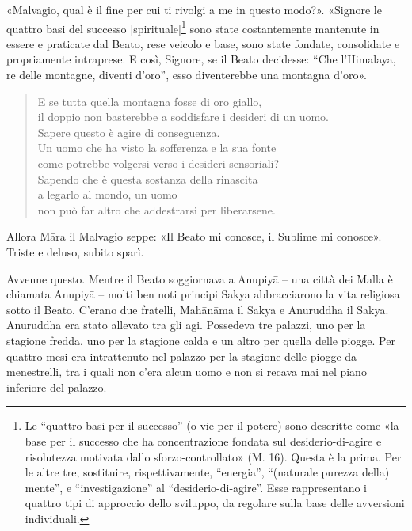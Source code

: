«Malvagio, qual è il fine per cui ti rivolgi a me in questo modo?». «Signore le
quattro basi del successo [spirituale]\footnote{Le “quattro basi per il
  successo” (o vie per il potere) sono descritte come «la base per il successo
  che ha concentrazione fondata sul desiderio-di-agire e risolutezza motivata
  dallo sforzo-controllato» (M. 16). Questa è la prima. Per le altre tre,
  sostituire, rispettivamente, “energia”, “(naturale purezza della) mente”, e
  “investigazione” al “desiderio-di-agire”. Esse rappresentano i quattro tipi di
  approccio dello sviluppo, da regolare sulla base delle avversioni
  individuali.} sono state costantemente mantenute in essere e praticate dal
Beato, rese veicolo e base, sono state fondate, consolidate e propriamente
intraprese. E così, Signore, se il Beato decidesse: “Che l’Himalaya, re delle
montagne, diventi d’oro”, esso diventerebbe una montagna d’oro».

\begin{quote}
E se tutta quella montagna fosse di oro giallo, \\
il doppio non basterebbe a soddisfare i desideri di un uomo. \\
Sapere questo è agire di conseguenza. \\
Un uomo che ha visto la sofferenza e la sua fonte \\
come potrebbe volgersi verso i desideri sensoriali? \\
Sapendo che è questa sostanza della rinascita \\
a legarlo al mondo, un uomo \\
non può far altro che addestrarsi per liberarsene.
\end{quote}

Allora Māra il Malvagio seppe: «Il Beato mi conosce, il Sublime mi conosce».
Triste e deluso, subito sparì.


 Avvenne questo. Mentre il Beato soggiornava a Anupiyā –
una città dei Malla è chiamata Anupiyā – molti ben noti principi Sakya
abbracciarono la vita religiosa sotto il Beato. C’erano due fratelli, Mahānāma
il Sakya e Anuruddha il Sakya. Anuruddha era stato allevato tra gli agi.
Possedeva tre palazzi, uno per la stagione fredda, uno per la stagione calda e
un altro per quella delle piogge. Per quattro mesi era intrattenuto nel palazzo
per la stagione delle piogge da menestrelli, tra i quali non c’era alcun uomo e
non si recava mai nel piano inferiore del palazzo.

